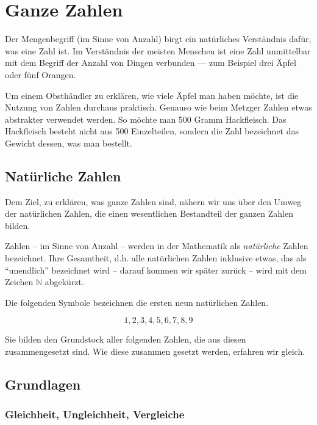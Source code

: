 \chapter{Ganze Zahlen}

Der Mengenbegriff (im Sinne von Anzahl) birgt ein natürliches Verständnis dafür, was eine Zahl ist. Im Verständnis der meisten Menschen ist eine Zahl unmittelbar mit dem Begriff der Anzahl von Dingen verbunden --- zum Beispiel drei Äpfel oder fünf Orangen.

Um einem Obsthändler zu erklären, wie viele Äpfel man haben möchte, ist die Nutzung von Zahlen durchaus praktisch. Genauso wie beim Metzger Zahlen etwas abstrakter verwendet werden. So möchte man 500 Gramm Hackfleisch. Das Hackfleisch besteht nicht aus 500 Einzelteilen, sondern die Zahl bezeichnet das Gewicht dessen, was man bestellt.

\section{Natürliche Zahlen}

Dem Ziel, zu erklären, was ganze Zahlen sind, nähern wir uns über den Umweg der natürlichen Zahlen, die einen wesentlichen Bestandteil der ganzen Zahlen bilden. 


\begin{definition}
Zahlen -- im Sinne von Anzahl -- werden in der Mathematik als \textsl{natürliche} Zahlen bezeichnet. Ihre Gesamtheit, d.h. alle natürlichen Zahlen inklusive etwas, das als "`unendlich"' bezeichnet wird -- darauf kommen wir später zurück -- wird mit dem Zeichen $\mathbb{N}$  abgekürzt.
\end{definition}

Die folgenden Symbole bezeichnen die ersten neun natürlichen Zahlen. 

\[ 
1, 2, 3, 4, 5, 6, 7, 8, 9
\]

Sie bilden den Grundstock aller folgenden Zahlen, die aus diesen zusammengesetzt sind. Wie diese zusammen gesetzt werden, erfahren wir gleich.

\section{Grundlagen}

\subsection{Gleichheit, Ungleichheit, Vergleiche}

